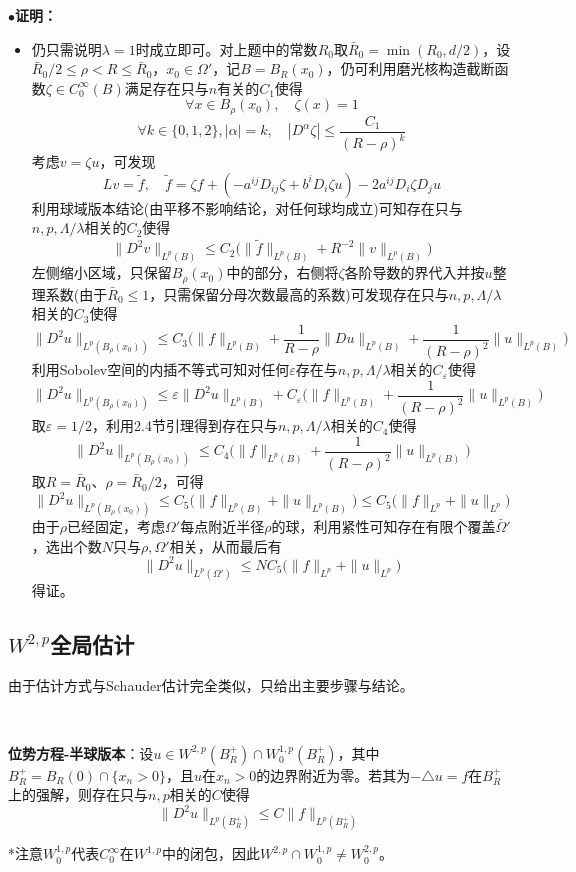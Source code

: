 \documentclass[a4paper,UTF8,fontset=windows,AutoFakeBold]{ctexart}
\newcommand{\proo}[1]{{\kaishu $\bullet$\textbf{证明：}
\begin{itemize}
    \item[] #1
\end{itemize}
}}
\begin{document}
\proo{
    仍只需说明$\lambda=1$时成立即可。对上题中的常数$R_0$取$\bar{R}_0=\min(R_0,d/2)$，设$\bar{R}_0/2\le\rho<R\le\bar{R}_0$，$x_0\in\Omega'$，记$B=B_R(x_0)$，仍可利用磨光核构造截断函数$\zeta\in C_0^\infty(B)$满足存在只与$n$有关的$C_1$使得
    $$\forall x\in B_\rho(x_0),\quad\zeta(x)=1$$
    $$\forall k\in\{0,1,2\},|\alpha|=k,\quad|D^\alpha\zeta|\le\frac{C_1}{(R-\rho)^k}$$
    考虑$v=\zeta u$，可发现
    $$Lv=\tilde{f},\quad\tilde{f}=\zeta f+(-a^{ij}D_{ij}\zeta+b^iD_i\zeta u)-2a^{ij}D_i\zeta D_ju$$
    利用球域版本结论(由平移不影响结论，对任何球均成立)可知存在只与$n,p,\Lambda/\lambda$相关的$C_2$使得
    $$\|D^2v\|_{L^p(B)}\le C_2\big(\|\tilde{f}\|_{L^p(B)}+R^{-2}\|v\|_{L^p(B)}\big)$$
    左侧缩小区域，只保留$B_\rho(x_0)$中的部分，右侧将$\zeta$各阶导数的界代入并按$u$整理系数(由于$\bar{R}_0\le1$，只需保留分母次数最高的系数)可发现存在只与$n,p,\Lambda/\lambda$相关的$C_3$使得
    $$\|D^2u\|_{L^p(B_\rho(x_0))}\le C_3\bigg(\|f\|_{L^p(B)}+\frac{1}{R-\rho}\|Du\|_{L^p(B)}+\frac{1}{(R-\rho)^2}\|u\|_{L^p(B)}\bigg)$$
    利用Sobolev空间的内插不等式可知对任何$\varepsilon$存在与$n,p,\Lambda/\lambda$相关的$C_\varepsilon$使得
    $$\|D^2u\|_{L^p(B_\rho(x_0))}\le\varepsilon\|D^2u\|_{L^p(B)}+C_\varepsilon\bigg(\|f\|_{L^p(B)}+\frac{1}{(R-\rho)^2}\|u\|_{L^p(B)}\bigg)$$
    取$\varepsilon=1/2$，利用2.4节引理得到存在只与$n,p,\Lambda/\lambda$相关的$C_4$使得
    $$\|D^2u\|_{L^p(B_\rho(x_0))}\le C_4\bigg(\|f\|_{L^p(B)}+\frac{1}{(R-\rho)^2}\|u\|_{L^p(B)}\bigg)$$
    取$R=\bar{R}_0$、$\rho=\bar{R}_0/2$，可得
    $$\|D^2u\|_{L^p(B_\rho(x_0))}\le C_5\big(\|f\|_{L^p(B)}+\|u\|_{L^p(B)}\big)\le C_5\big(\|f\|_{L^p}+\|u\|_{L^p}\big)$$
    由于$\rho$已经固定，考虑$\Omega'$每点附近半径$\rho$的球，利用紧性可知存在有限个覆盖$\bar\Omega'$，选出个数$N$只与$\rho,\Omega'$相关，从而最后有
    $$\|D^2u\|_{L^p(\Omega')}\le NC_5\big(\|f\|_{L^p}+\|u\|_{L^p}\big)$$
    得证。
}

\subsection{$W^{2,p}$全局估计}
由于估计方式与Schauder估计完全类似，只给出主要步骤与结论。

\

\textbf{位势方程-半球版本}：设$u\in W^{2,p}(B_R^+)\cap W_0^{1,p}(B_R^+)$，其中$B_R^+=B_R(0)\cap\{x_n>0\}$，且$u$在$x_n>0$的边界附近为零。若其为$-\triangle u=f$在$B_R^+$上的强解，则存在只与$n,p$相关的$C$使得
$$\|D^2u\|_{L^p(B_R^+)}\le C\|f\|_{L^p(B_R^+)}$$

*注意$W_0^{1,p}$代表$C_0^\infty$在$W^{1,p}$中的闭包，因此$W^{2,p}\cap W^{1,p}_0\ne W^{2,p}_0$。
\end{document}
